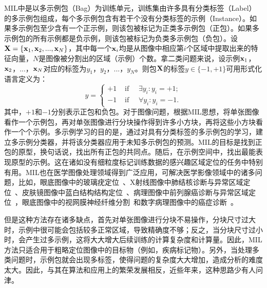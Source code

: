 MIL中是以多示例包（Bag）为训练单元，训练集由许多具有分类标签（Label）的多示例包组成，每个多示例包含有若干个没有分类标签的示例（Instance）。如果多示例包至少含有一个正示例，则该包被标记为正类多示例包（正包）。如果多示例包的所有示例都是负示例，则该包被标记为负类多示例包（负包）。设$\mathbf{X}=\{\mathbf{x}_1,\mathbf{x}_2,...,\mathbf{x}_N\}$，其中每一个$\mathbf{x}_i$均是从图像中相应第$i$个区域中提取出来的特征向量，$N$是图像被分割出的区域（示例）个数。拿二类问题来说，设示例${\mathbf{x}_1}$，$\mathbf{x}_2$，...，$\mathbf{x}_N$对应的标签为${y_1}$，${y_2}$，...，${y_N}$。则包$\mathbf{X}$的标签$y\in \{-1,+1\}$可用形式化语言定义为：
\begin{equation}
y=\left\{\begin{array}{ll}
{+1} & {\text { if } \quad \exists {y}_{i}: {y}_{i}=+1;} \\
{-1} & {\text { if } \quad \forall {y}_{i}: {y}_{i}=-1.}
\end{array}\right.
\end{equation}
其中，$+1$和$-1$分别表示正包和负包。对于图像问题，根据MIL思想，将单张图像看作一个示例包，再对单张图像进行分块操作得到许多小方块，再将这些小方块看作一个个示例。多示例学习的目的是，通过对具有分类标签的多示例包的学习，建立多示例分类器，并将该分类器应用于未知多示例包的预测。MIL的目标是找到正包的原型，换句话说，找出所有正包的共同点。随后，在示例空间中，找出最能表现原型的示例。这在诸如没有细粒度标记训练数据的感兴趣区域定位的任务中特别有用。MIL也在医学图像处理领域得到广泛应用，可解决医学影像领域中的诸多问题，比如，眼底图像中的玻璃疣定位~\cite{lu2015effective}、X射线图像中肺结核诊断与异常区域定位~\cite{melendez2014novel}、皮肤镜图像中蓝白结构结构定位~\cite{madooei2018learning}、病理图像中前列腺癌诊断与异常区域定位~\cite{campanella2018terabyte}，眼底图像中的视网膜神经纤维分割~\cite{manivannan2017subcategory}和数字病理图像中的癌症诊断~\cite{kandemir2014empowering}。

但是这种方法存在诸多缺点，首先对单张图像进行分块不易操作，分块尺寸过大时，示例中很可能会包括较多正常区域，导致精确度不够；反之，当分块尺寸过小时，会产生过多示例，这将大大增大后续训练的计算复杂度和计算量。因此，MIL方法只适合用于粗略定位图像中的目标物（例如，疾病标记物）。另外，当处理多类问题时，示例包就会出现多标签，使得问题的复杂度大大增加，造成分析的难度太大。因此，与其在算法和应用上的繁荣发展相反，近些年来，这种思路少有人问津。

